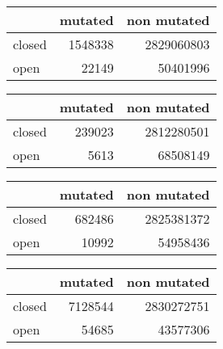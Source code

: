 \begin{table}[!htb]
    \begin{subtable}[!h]{.5\textwidth}
        \centering
        \begin{tabular}{ l r r }
        \bf{} & \bf{mutated} & \bf{non mutated} \\
        \hline
        closed & 1548338 &  2829060803 \\
        open &   22149 &    50401996 \\
        \end{tabular}
        \vspace{0.2cm}
    \end{subtable} 
    \quad %
    \begin{subtable}[!h]{.5\textwidth}
        \centering
        \begin{tabular}{ l r r }
        \bf{} & \bf{mutated} & \bf{non mutated} \\
        \hline
        closed &  239023 &  2812280501 \\
        open &    5613 &    68508149 \\
        \end{tabular}
        \vspace{0.2cm}
    \end{subtable}  
    \vspace{0.5cm}
    
    \begin{subtable}[!h]{.5\textwidth}
        \centering
        \begin{tabular}{ l r r }
        \bf{} & \bf{mutated} & \bf{non mutated} \\
        \hline
        closed &  682486 &  2825381372 \\
        open &   10992 &    54958436 \\
        \end{tabular}
        \vspace{0.2cm}
    \end{subtable} 
    \quad %
    \begin{subtable}[!h]{.5\textwidth}
        \centering
        \begin{tabular}{ l r r }
        \bf{} & \bf{mutated} & \bf{non mutated} \\
        \hline
        closed & 7128544 &  2830272751 \\
        open &   54685 &    43577306 \\
        \end{tabular}
        \vspace{0.2cm}
    \end{subtable}  
    \label{fig:tab_g-test_contingency}
\end{table}